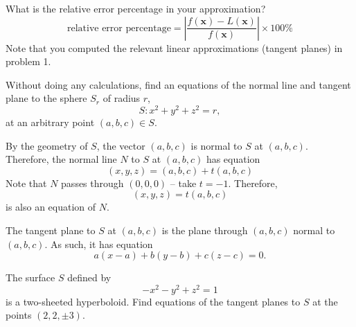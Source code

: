 \documentclass{exam}
\begin{document}
\begin{questions}
    What is the relative error percentage in your approximation?
    \[
        \text{relative error percentage} = \left|\frac{f(\mathbf{x})-L(\mathbf{x})}{f(\mathbf{x})}\right|\times 100\%
    \]
    Note that you computed the relevant linear approximations (tangent planes) in problem 1.

    \question
    Without doing any calculations, find an equations of the normal line and tangent plane
    to the sphere $S_r$ of radius $r$,
    \[
        S:x^2+y^2+z^2=r,
    \]
    at an arbitrary point $(a,b,c)\in S$.

    \begin{solution}
        By the geometry of $S$, the vector $(a,b,c)$ is normal to $S$ at $(a,b,c)$.
        Therefore, the normal line $N$ to $S$ at $(a,b,c)$ has equation
        \[
            (x,y,z) = (a,b,c) + t(a,b,c)
        \]
        Note that $N$ passes through $(0,0,0)$ -- take $t=-1$. Therefore,
        \[
            (x,y,z) = t(a,b,c)
        \]
        is also an equation of $N$.

        The tangent plane to $S$ at $(a,b,c)$ is the plane through $(a,b,c)$ normal to $(a,b,c)$. As such, it has equation
        \[
            a(x-a) + b(y-b) + c(z-c) = 0.
        \]
    \end{solution}

    \question The surface $S$ defined by
    \[
        -x^2 - y^2 + z^2 = 1
    \]
    is a two-sheeted hyperboloid.
    Find equations of the tangent planes to $S$
    at the points $(2,2,\pm 3)$.


\end{questions}
\end{document}
